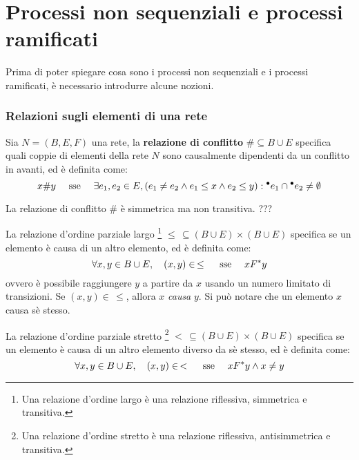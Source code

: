 \section{Processi non sequenziali e processi ramificati}
Prima di poter spiegare cosa sono i processi non sequenziali e i processi ramificati, è necessario introdurre alcune nozioni.

\subsubsection{Relazioni sugli elementi di una rete}

\begin{defn}
    Sia $N = (B, E, F)$ una rete, la \textbf{relazione di conflitto} $\# \subseteq B \cup E$ specifica quali coppie di elementi della rete $N$ sono causalmente dipendenti da un conflitto in avanti, ed è definita come:
    \[
        x \# y \quad \textnormal{ sse } \quad \exists e_1, e_2 \in E, (e_1 \neq e_2 \land e_1 \le x \land e_2 \le y) : {^\bullet}e_1 \cap {^\bullet}e_2 \neq \emptyset
    \]
\end{defn}

\begin{rem}
    La relazione di conflitto $\#$ è simmetrica ma non transitiva. ???
\end{rem}

\begin{defn}
    La relazione d'ordine parziale largo \footnote{Una relazione d'ordine largo è una relazione riflessiva, simmetrica e transitiva.} $\le \, \subseteq (B \cup E) \times (B \cup E)$ specifica se un elemento è causa di un altro elemento, ed è definita come:
    \[
        \forall x, y \in B \cup E, \quad (x, y) \in \, \le \quad \textnormal{ sse } \quad x F^*y
    \]
    ovvero è possibile raggiungere $y$ a partire da $x$ usando un numero limitato di transizioni. Se $(x,y) \in \, \le$, allora $x$ \textit{causa} $y$.
    Si può notare che un elemento $x$ causa sè stesso.
\end{defn}

\begin{defn}
    La relazione d'ordine parziale stretto \footnote{Una relazione d'ordine stretto è una relazione riflessiva, antisimmetrica e transitiva.} $< \, \subseteq (B \cup E) \times (B \cup E)$ specifica se un elemento è causa di un altro elemento diverso da sè stesso, ed è definita come:
    \[
        \forall x, y \in B \cup E, \quad (x, y) \in \, < \quad \textnormal{ sse } \quad x F^*y \land x \neq y
    \]
\end{defn}

